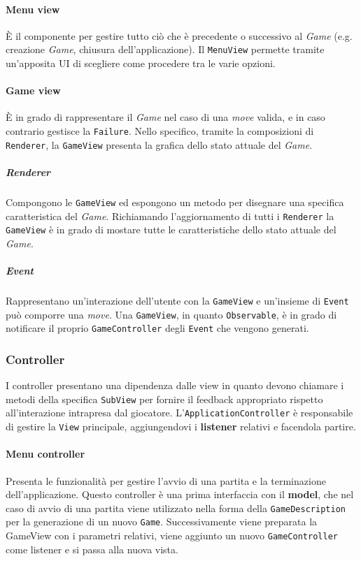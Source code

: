 \paragraph{Menu view} 
%
È il componente per gestire tutto ciò che è precedente o successivo al \textit{Game} (e.g. creazione \textit{Game}, chiusura dell'applicazione).
%
Il \texttt{MenuView} permette tramite un'apposita UI di scegliere come procedere tra le varie opzioni.
\paragraph{Game view} 
%
È in grado di rappresentare il \textit{Game} nel caso di una \textit{move} valida, e in caso contrario gestisce la \texttt{Failure}.
%
Nello specifico, tramite la composizioni di \texttt{Renderer}, la \texttt{GameView} presenta la grafica dello stato attuale del \textit{Game}.
\subparagraph{Renderer}
%
Compongono le \texttt{GameView} ed espongono un metodo per disegnare una specifica caratteristica del \textit{Game}.
%
Richiamando l'aggiornamento di tutti i \texttt{Renderer} la \texttt{GameView} è in grado di mostare tutte le caratteristiche dello stato attuale del \textit{Game}.
\subparagraph{Event}
%
Rappresentano un'interazione dell'utente con la \texttt{GameView} e un'insieme di \texttt{Event} può comporre una \textit{move}.
%
Una \texttt{GameView}, in quanto \texttt{Observable}, è in grado di notificare il proprio \texttt{GameController} degli \texttt{Event} che vengono generati.


\subsubsection{Controller}
I controller presentano una dipendenza dalle view in quanto devono chiamare i metodi della specifica \texttt{SubView} per fornire il feedback appropriato rispetto all'interazione intrapresa dal giocatore.
%
L'\texttt{ApplicationController} è responsabile di gestire la \texttt{View} principale, aggiungendovi i \textbf{listener} relativi e facendola partire.
\paragraph{Menu controller}
%
Presenta le funzionalità per gestire l'avvio di una partita e la terminazione dell'applicazione.
%
Questo controller è una prima interfaccia con il \textbf{model}, che nel caso di avvio di una partita viene utilizzato nella forma della \texttt{GameDescription} per la generazione di un nuovo \texttt{Game}.
%
Successivamente viene preparata la GameView con i parametri relativi, viene aggiunto un nuovo \texttt{GameController} come listener e si passa alla nuova vista.
